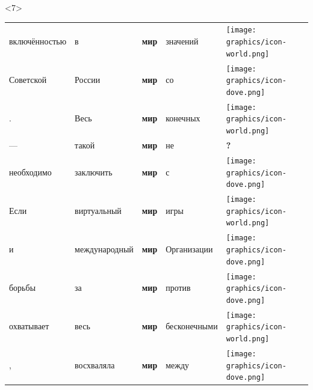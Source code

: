 \documentclass[10pt, compress]{beamer}
\begin{document}
\begin{frame}
\begin{center}
\begin{onlyenv}<7>
\begin{tabular}{p{2.5cm}p{2.5cm}p{1.0cm}p{2.5cm}p{1.0cm}}
включённостью  & в    &  \textbf{мир}  & значений     &   \texttt{[image: graphics/icon-world.png]}     \\
Советской      & России    &  \textbf{мир}  & со     &    \texttt{[image: graphics/icon-dove.png]}    \\
.      & Весь    &  \textbf{мир}  &  конечных    &    \texttt{[image: graphics/icon-world.png]}    \\
—      & такой    &  \textbf{мир}  &  не    &   \textbf{?}   \\
необходимо      & заключить    &  \textbf{мир}  & с     &  \texttt{[image: graphics/icon-dove.png]}      \\
Если      & виртуальный    &  \textbf{мир}  & игры     &   \texttt{[image: graphics/icon-world.png]}     \\
и      & международный    &  \textbf{мир}  & Организации     &   \texttt{[image: graphics/icon-dove.png]}     \\
борьбы      & за    &  \textbf{мир}  & против     &   \texttt{[image: graphics/icon-dove.png]}     \\
охватывает      & весь    &  \textbf{мир}  &  бесконечными    &  \texttt{[image: graphics/icon-world.png]}      \\
,      & восхваляла    &  \textbf{мир}  & между     &   \texttt{[image: graphics/icon-dove.png]}     \\
\end{tabular}

\end{onlyenv}





\end{center}
% 


\end{frame}
\end{document}
